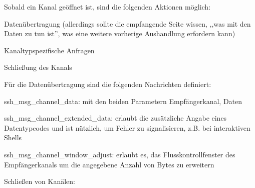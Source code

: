 \documentclass[a4paper]{article}
\begin{document}
\begin{multicols}{3}
\begin{itemize*}
\begin{itemize*}
\begin{itemize*}
                  \end{itemize*}
                  \item
                  Sobald ein Kanal geöffnet ist, sind die folgenden Aktionen möglich:

                  \begin{itemize*}
                        \item Datenübertragung (allerdings sollte die empfangende Seite wissen, ,,was mit den Daten zu tun ist'', was eine weitere vorherige Aushandlung erfordern kann)
                        \item Kanaltypspezifische Anfragen
                        \item Schließung des Kanals
                  \end{itemize*}
                  \item
                  Für die Datenübertragung sind die folgenden Nachrichten definiert:

                  \begin{itemize*}
                        \item ssh\_msg\_channel\_data: mit den beiden Parametern Empfängerkanal, Daten
                        \item ssh\_msg\_channel\_extended\_data: erlaubt die zusätzliche Angabe eines Datentypcodes und ist nützlich, um Fehler zu signalisieren, z.B. bei interaktiven Shells
                        \item ssh\_msg\_channel\_window\_adjust: erlaubt es, das Flusskontrollfenster des Empfängerkanals um die angegebene Anzahl von Bytes zu erweitern
                  \end{itemize*}
                  \item
                  Schließen von Kanälen:


\end{itemize*}
\end{itemize*}
\end{multicols}
\end{document}
